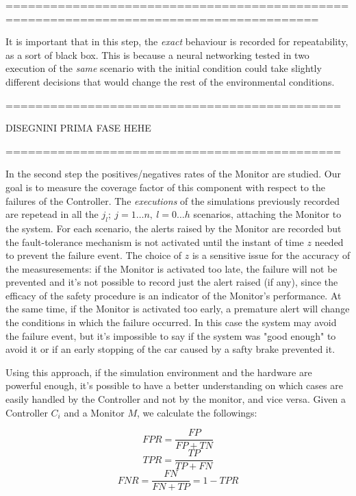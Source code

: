 ========================================================================================
\newline

It is important that in this step, the \textsl{exact} behaviour is recorded for repeatability, as a sort of black box. This is because a neural networking tested in two execution of the \textsl{same} scenario with the  initial condition could take slightly different decisions that would change the rest of the environmental conditions.\newline\newline

=============================================

DISEGNINI PRIMA FASE HEHE

=============================================

In the second step the positives/negatives rates of the Monitor are studied. Our goal is to measure the coverage factor of this component with respect to the failures of the Controller.\newline
The \textsl{executions} of the simulations previously recorded are repetead in all the $j_{l}; \: j=1\dots n, \: l=0\dots h$ scenarios, attaching the Monitor to the system. For each scenario, the alerts raised by the Monitor are recorded but the fault-tolerance mechanism is not activated until the instant of time $z$ needed to prevent the failure event. The choice of $z$ is a sensitive issue for the accuracy of the measuresements: if the Monitor is activated too late, the failure will not be prevented and it's not possible to record just the alert raised (if any), since the efficacy of the safety procedure is an indicator of the Monitor's performance. At the same time, if the Monitor is activated too early, a premature alert will change the conditions in which the failure occurred. In this case the system may avoid the failure event, but it's impossible to say if the system was "good enough" to avoid it or if an early stopping of the car caused by a safty brake prevented it.

Using this approach, if the simulation environment and the hardware are powerful enough, it's possible to have a better understanding on which cases are easily handled by the Controller and not by the monitor, and vice versa.
Given a Controller $C_{i}$ and a Monitor $M$, we calculate the followings:

\begin{equation}
	FPR = \frac{FP}{FP+TN}
\end{equation}
\begin{equation}
	TPR = \frac{TP}{TP+FN}
\end{equation}
\begin{equation}
	FNR = \frac{FN}{FN+TP} = 1 - TPR
\end{equation}

